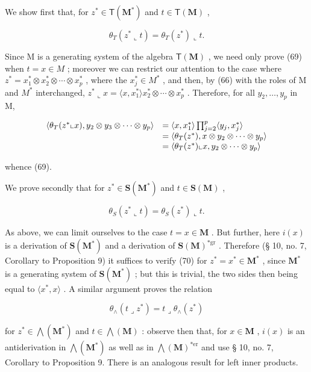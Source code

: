 We show first that, for \(z^{*} \in \mathsf{T}(\mathbf{M}^{*})\) and \(t \in \mathsf{T}(\mathbf{M})\) ,

\[
\theta_ {T} (z ^ {*} \llcorner t) = \theta_ {T} (z ^ {*}) \llcorner t.\tag{69}
\]

Since M is a generating system of the algebra \(\mathsf{T}(\mathbf{M})\) , we need only prove (69) when \(t = x \in M\) ; moreover we can restrict our attention to the case where \(z^{*} = x_{1}^{*} \otimes x_{2}^{*} \otimes \cdots \otimes x_{p}^{*}\) , where the \(x_{j}^{*} \in M^{*}\) , and then, by (66) with the roles of M and \(M^{*}\) interchanged, \(z^{*} \llcorner x = \langle x, x_{1}^{*} \rangle x_{2}^{*} \otimes \cdots \otimes x_{p}^{*}\) . Therefore, for all \(y_{2}, \ldots, y_{p}\) in M,

\[
\begin{array}{r l} \langle \theta_ {T} (z ^ {*} \llcorner x), y _ {2} \otimes y _ {3} \otimes \dots \otimes y _ {p} \rangle & = \langle x, x _ {1} ^ {*} \rangle \prod_ {j = 2} ^ {p} \langle y _ {j}, x _ {j} ^ {*} \rangle \\ & = \langle \theta_ {T} (z ^ {*}), x \otimes y _ {2} \otimes \dots \otimes y _ {p} \rangle \\ & = \langle \theta_ {T} (z ^ {*}) \llcorner x, y _ {2} \otimes \dots \otimes y _ {p} \rangle \end{array}
\]

whence (69).

We prove secondly that for \(z^{*} \in \mathbf{S}(\mathbf{M}^{*})\) and \(t \in \mathbf{S}(\mathbf{M})\) ,

\[
\theta_ {S} (z ^ {*} \llcorner t) = \theta_ {S} (z ^ {*}) \llcorner t.\tag{70}
\]

As above, we can limit ourselves to the case \(t = x \in \mathbf{M}\) . But further, here \(i(x)\) is a derivation of \(\mathbf{S}(\mathbf{M}^*)\) and a derivation of \(\mathbf{S}(\mathbf{M})^{*\text{gr}}\) . Therefore (§ 10, no. 7, Corollary to Proposition 9) it suffices to verify (70) for \(z^* = x^* \in \mathbf{M}^*\) , since \(\mathbf{M}^*\) is a generating system of \(\mathbf{S}(\mathbf{M}^*)\) ; but this is trivial, the two sides then being equal to \(\langle x^*, x \rangle\) . A similar argument proves the relation

\[
\theta_ {\wedge} (t \lrcorner z ^ {*}) = t \lrcorner \theta_ {\wedge} (z ^ {*})\tag{71}
\]

for \(z^{*} \in \bigwedge(\mathbf{M}^{*})\) and \(t \in \bigwedge(\mathbf{M})\) : observe then that, for \(x \in \mathbf{M}\) , \(i(x)\) is an antiderivation in \(\bigwedge(\mathbf{M}^{*})\) as well as in \(\bigwedge(\mathbf{M})^{*\text{er}}\) and use § 10, no. 7, Corollary to Proposition 9. There is an analogous result for left inner products.

